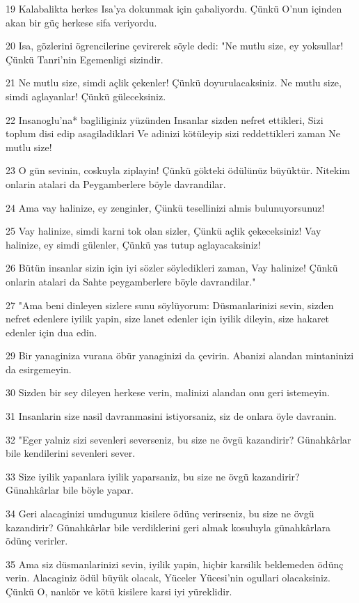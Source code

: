 \par 19 Kalabalikta herkes Isa'ya dokunmak için çabaliyordu. Çünkü O'nun içinden akan bir güç herkese sifa veriyordu.
\par 20 Isa, gözlerini ögrencilerine çevirerek söyle dedi: "Ne mutlu size, ey yoksullar! Çünkü Tanri'nin Egemenligi sizindir.
\par 21 Ne mutlu size, simdi açlik çekenler! Çünkü doyurulacaksiniz. Ne mutlu size, simdi aglayanlar! Çünkü güleceksiniz.
\par 22 Insanoglu'na* bagliliginiz yüzünden Insanlar sizden nefret ettikleri, Sizi toplum disi edip asagiladiklari Ve adinizi kötüleyip sizi reddettikleri zaman Ne mutlu size!
\par 23 O gün sevinin, coskuyla ziplayin! Çünkü gökteki ödülünüz büyüktür. Nitekim onlarin atalari da Peygamberlere böyle davrandilar.
\par 24 Ama vay halinize, ey zenginler, Çünkü tesellinizi almis bulunuyorsunuz!
\par 25 Vay halinize, simdi karni tok olan sizler, Çünkü açlik çekeceksiniz! Vay halinize, ey simdi gülenler, Çünkü yas tutup aglayacaksiniz!
\par 26 Bütün insanlar sizin için iyi sözler söyledikleri zaman, Vay halinize! Çünkü onlarin atalari da Sahte peygamberlere böyle davrandilar."
\par 27 "Ama beni dinleyen sizlere sunu söylüyorum: Düsmanlarinizi sevin, sizden nefret edenlere iyilik yapin, size lanet edenler için iyilik dileyin, size hakaret edenler için dua edin.
\par 29 Bir yanaginiza vurana öbür yanaginizi da çevirin. Abanizi alandan mintaninizi da esirgemeyin.
\par 30 Sizden bir sey dileyen herkese verin, malinizi alandan onu geri istemeyin.
\par 31 Insanlarin size nasil davranmasini istiyorsaniz, siz de onlara öyle davranin.
\par 32 "Eger yalniz sizi sevenleri severseniz, bu size ne övgü kazandirir? Günahkârlar bile kendilerini sevenleri sever.
\par 33 Size iyilik yapanlara iyilik yaparsaniz, bu size ne övgü kazandirir? Günahkârlar bile böyle yapar.
\par 34 Geri alacaginizi umdugunuz kisilere ödünç verirseniz, bu size ne övgü kazandirir? Günahkârlar bile verdiklerini geri almak kosuluyla günahkârlara ödünç verirler.
\par 35 Ama siz düsmanlarinizi sevin, iyilik yapin, hiçbir karsilik beklemeden ödünç verin. Alacaginiz ödül büyük olacak, Yüceler Yücesi'nin ogullari olacaksiniz. Çünkü O, nankör ve kötü kisilere karsi iyi yüreklidir.
